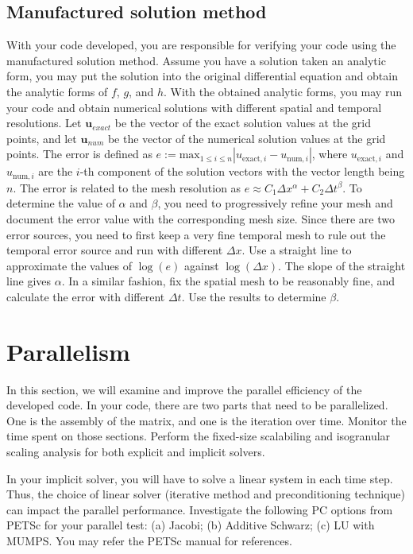 \documentclass[12pt]{article}
\begin{document}
\subsection{Manufactured solution method}
With your code developed, you are responsible for verifying your code using the manufactured solution method. Assume you have a solution taken an analytic form, you may put the solution into the original differential equation and obtain the analytic forms of $f$, $g$, and $h$. With the obtained analytic forms, you may run your code and obtain numerical solutions with different spatial and temporal resolutions. Let $\bm u_{exact}$ be the vector of the exact solution values at the grid points, and let $\bm u_{num}$ be the vector of the numerical solution values at the grid points. The error is defined as $e := \mathrm{max}_{1 \leq i \leq n} |  u_{\mathrm{exact}, i} -  u_{\mathrm{num}, i}| $, where $u_{\mathrm{exact}, i}$ and $u_{\mathrm{num}, i}$ are the $i$-th component of the solution vectors with the vector length being $n$. The error is related to the mesh resolution as $e \approx C_1 \Delta x^{\alpha} + C_2 \Delta t^{\beta}$. To determine the value of $\alpha$ and $\beta$, you need to progressively refine your mesh and document the error value with the corresponding mesh size. Since there are two error sources, you need to first keep a very fine temporal mesh to rule out the temporal error source and run with different $\Delta x$. Use a straight line to approximate the values of $\log(e)$ against $\log(\Delta x)$. The slope of the straight line gives $\alpha$. In a similar fashion, fix the spatial mesh to be reasonably fine, and calculate the error with different $\Delta t$. Use the results to determine $\beta$.

\section{Parallelism}
In this section, we will examine and improve the parallel efficiency of the developed code. In your code, there are two parts that need to be parallelized. One is the assembly of the matrix, and one is the iteration over time. Monitor the time spent on those sections. Perform the fixed-size scalabiling and isogranular scaling analysis for both explicit and implicit solvers.

In your implicit solver, you will have to solve a linear system in each time step. Thus, the choice of linear solver (iterative method and preconditioning technique) can impact the parallel performance. Investigate the following PC options from PETSc for your parallel test: (a) Jacobi; (b) Additive Schwarz; (c) LU with MUMPS. You may refer the PETSc manual for references.
\end{document}
